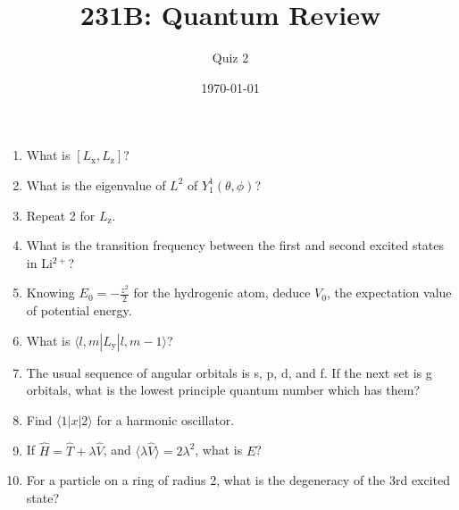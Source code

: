 




\title{231B: Quantum Review}
\author{Quiz 2}
\date{\today}
\maketitle

\begin{enumerate}
\item What is $[L_{\text{x}},L_{\text{z}}]$?

\item What is the eigenvalue of $L^2$ of $Y_1^1(\theta,\phi)$?

\item Repeat 2 for $L_{\text{z}}$.

\item What is the transition frequency between the first and second
excited states in Li$^{2+}$?

\item Knowing $E_0 = -\frac{z^2}{2}$ for the hydrogenic atom,
deduce $V_0$, the expectation value of potential energy.

\item What is $\langle l,m| L_{\text{y}} | l,m-1 \rangle$?

\item The usual sequence of angular orbitals is s, p, d, and f. If
the next set is g orbitals, what is the lowest principle quantum
number which has them?

\item Find $\langle 1 | x | 2 \rangle$ for a harmonic oscillator.

\item If $\hat{H} = \hat{T} + \lambda \hat{V}$, and
$\langle \lambda\hat{V}\rangle = 2\lambda^2$, what is $E$?

\item For a particle on a ring of radius 2, what is the degeneracy of
the 3rd excited state?

\end{enumerate}

